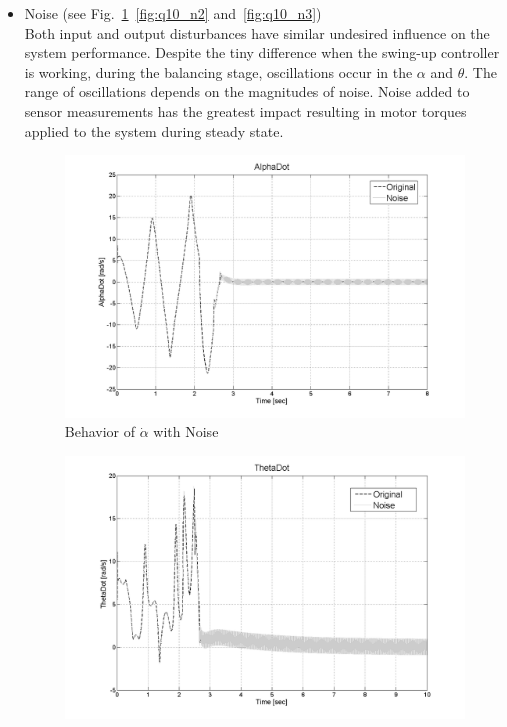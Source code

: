 \documentclass{article}
\theoremstyle{plain}
\theoremstyle{definition}
\theoremstyle{remark}
\begin{document}
\begin{itemize}
\item Noise (see Fig.~\ref{fig:q10_n1}~\ref{fig:q10_n2} and~\ref{fig:q10_n3})\\

Both input and output disturbances have similar undesired influence on the system performance. Despite the tiny difference when the swing-up controller is working, during the balancing stage, oscillations occur in the $\alpha$ and $\theta$. The range of oscillations depends on the magnitudes of noise. Noise added to sensor measurements has the greatest impact resulting in motor torques applied to the system during steady state.  

\begin{figure}[h]
\includegraphics[width=1\textwidth]{q10_n1.png}
\caption{Behavior of $\dot{\alpha}$ with Noise} \label{tex}
\label{fig:q10_n1}
\end{figure}
\begin{figure}[h]
\includegraphics[width=1\textwidth]{q10_n2.png}

\end{figure}
\end{itemize}
\end{document}
